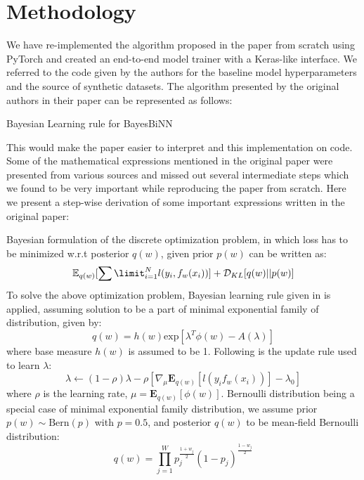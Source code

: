 \section{Methodology}

We have re-implemented the algorithm proposed in the paper from scratch using PyTorch and created an end-to-end model trainer with a Keras-like interface. We referred to the code given by the authors for the baseline model hyperparameters and the source of synthetic datasets. The algorithm presented by the original authors in their paper can be represented as follows:

\begin{algorithm}[H]
\SetAlgoLined
\DontPrintSemicolon

 \;
 
 \caption{Bayesian Learning rule for BayesBiNN}
\label{alg:alg1}
\end{algorithm}

This would make the paper easier to interpret and this implementation on code.
Some of the mathematical expressions mentioned in the original paper were presented from various sources and missed out several intermediate steps which we found to be very important while reproducing the paper from scratch. Here we present a step-wise derivation of some important expressions written in the original paper: 

Bayesian formulation of the discrete optimization problem, in which loss has to be minimized w.r.t posterior $q(w)$, given prior $p(w)$ can be written as: 
\[\mathbb{E}_{q(w)} [\sum\limit_{i=1}^{N}l(y_{i}, f_{w}(x_{i}))] + \mathcal{D}_{KL}[q(w)||p(w)]\]
To solve the above optimization problem, Bayesian learning rule given in \citet{r6} is applied, assuming solution to be a part of minimal exponential family of distribution, given by: \[q(w) = h(w)\text{exp}[\lambda^{T}\phi(w) - A(\lambda)]\]  
where base measure $h(w)$ is assumed to be 1. Following is the update rule used to learn $\lambda$: \[\lambda \leftarrow (1-\rho)\lambda - \rho[\nabla_{\mu}\mathbf{E}_{q(w)}[l(y_{i} f_{w}(x_{i}))]-\lambda_{0}]\] where $\rho$ is the learning rate, $\mu = \mathbf{E}_{q(w)}[\phi(w)]$. Bernoulli distribution being a special case of minimal exponential family distribution, we assume prior $p(w) \sim \mathrm{Bern}(p)$ with $p = 0.5$, and posterior $q(w)$ to be mean-field Bernoulli distribution: \[q(w) = \prod_{j=1}^W p_{j}^{\frac{1+w_{j}}{2}}(1-p_{j})^{\frac{1-w_{j}}{2}} \]   

